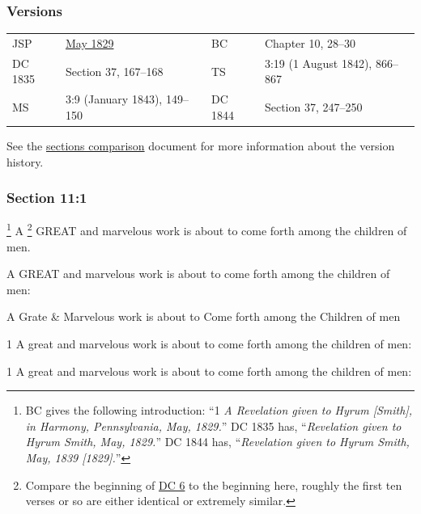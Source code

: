 	\subsubsection{Versions}
		\label{DC11-V}
	
		\begin{tabular}{p{1in}p{2in}p{1in}p{2in}}
			JSP		& \hyperref[EMS-1828-1829-JS-MAY-1829-A]{May 1829}	& BC & Chapter 10, 28--30 \\
			DC 1835	& Section 37, 167--168								& TS & 3:19 (1 August 1842), 866--867 \\
			MS		& 3:9 (January 1843), 149--150						& DC 1844 & Section 37, 247--250 \\
		\end{tabular}
		
		\medskip
		
		See the \href{https://drive.google.com/file/d/1goAvNz8jS4R8slYfMG_db55Ty2z_vmgK/view?usp=sharing}{sections comparison} document for more information about the version history.

	\subsubsection{Section 11:1} %
		\label{DC11-1}

			\footnote{%
				BC gives the following introduction: ``1 \textit{A Revelation given to Hyrum [Smith], in Harmony, Pennsylvania, May, 1829.}'' DC 1835 has, ``\textit{Revelation given to Hyrum Smith, May, 1829.}'' DC 1844 has, ``\textit{Revelation given to Hyrum Smith, May, 1839 [1829].}''
				}%
		A%
			\footnote{%
				Compare the beginning of \hyperref[DC6]{DC 6} to the beginning here, roughly the first ten verses or so are either identical or extremely similar.
				}
		GREAT and marvelous work is about to come forth among the children of men.

		\begin{framed}
		\scriptsize
			\begin{compactdesc}
				\item[JSP] A GREAT and marvelous work is about to come forth among the children of men: 
				\item[HS] A Grate \& Marvelous work is about to Come forth among the Children of men
				\item[DC 1835] 1 A great and marvelous work is about to come forth among the children of men: 
				\item[DC 1844] 1 A great and marvelous work is about to come forth among the children of men: 
			\end{compactdesc}
		\end{framed}

